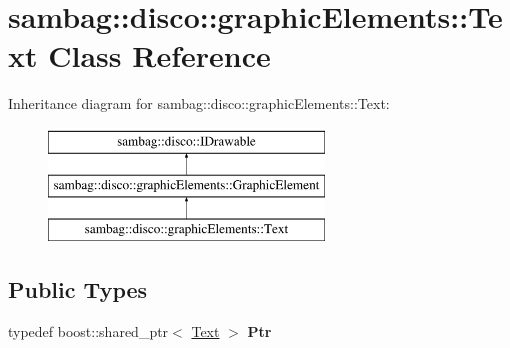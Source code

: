 \hypertarget{classsambag_1_1disco_1_1graphic_elements_1_1_text}{
\section{sambag::disco::graphicElements::Text Class Reference}
\label{classsambag_1_1disco_1_1graphic_elements_1_1_text}
}
Inheritance diagram for sambag::disco::graphicElements::Text:\begin{figure}[H]
\begin{center}
\leavevmode
\includegraphics[height=3.000000cm]{classsambag_1_1disco_1_1graphic_elements_1_1_text}
\end{center}
\end{figure}
\subsection*{Public Types}
\begin{DoxyCompactItemize}
\item 
\hypertarget{classsambag_1_1disco_1_1graphic_elements_1_1_text_a16e3ebb58fc12688a401ee10fc99fd13}{
typedef boost::shared\_\-ptr$<$ \hyperlink{classsambag_1_1disco_1_1graphic_elements_1_1_text}{Text} $>$ {\bfseries Ptr}}
\label{classsambag_1_1disco_1_1graphic_elements_1_1_text_a16e3ebb58fc12688a401ee10fc99fd13}

\end{DoxyCompactItemize}
